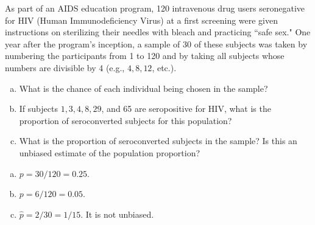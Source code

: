\documentclass[12pt]{article}
\begin{document}
    \begin{exercise}[Levy-2.4]
        As part of an AIDS education program, 120 intravenous drug users seronegative for HIV (Human Immunodeficiency Virus) at a first screening were given instructions on sterilizing their needles with bleach and practicing ``safe sex." One year after the program's inception, a sample of 30 of these subjects was taken by numbering the participants from 1 to 120 and by taking all subjects whose numbers are divisible by 4 (e.g., \(4,8,12\), etc.). 
        \begin{enumerate}[a.]
            \item What is the chance of each individual being chosen in the sample?
            \item If subjects \(1,3,4,8,29\), and 65 are seropositive for HIV, what is the proportion of seroconverted subjects for this population?
            \item What is the proportion of seroconverted subjects in the sample? Is this an unbiased estimate of the population proportion?
        \end{enumerate}
    \end{exercise}

    \begin{solution}
        \begin{enumerate}[a.]
            \item $p=30/120=0.25$. 
            \item $p=6/120=0.05$.
            \item $\hat{p}=2/30=1/15$. It is not unbiased. 
        \end{enumerate}
    \end{solution}
\end{document}
